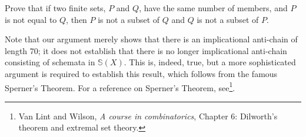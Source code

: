 \begin{aside}
    Prove that if two finite sets, $P$ and $Q$, have the same number of members, and $P$ is not equal to $Q$, then $P$ is not a subset of $Q$ and $Q$ is not a subset of $P$.
\end{aside}

Note that our argument merely shows that there is an implicational anti-chain of length 70; it does not establish that there is no longer implicational anti-chain consisting of schemata in $\mathbb{S}(X)$. This is, indeed, true, but a more sophisticated argument is required to establish this result, which follows from the famous Sperner's Theorem. For a reference on Sperner's Theorem, see\footnote{Van Lint and Wilson, \emph{A course in combinatorics}, Chapter 6: Dilworth's theorem and extremal set theory.}. 